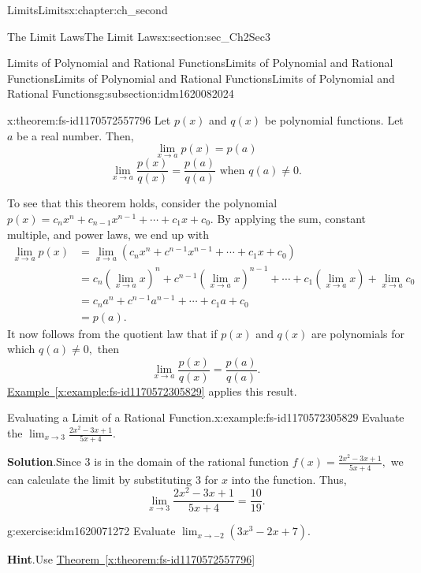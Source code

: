 \documentclass[oneside,10pt,]{book}
\newcommand{\blocktitlefont}{\relax}
\newcommand{\xreffont}{\relax}
\numberwithin{equation}{section}
\newcommand{\amp}{&}
\begin{document}
\begin{chapterptx}{Limits}{}{Limits}{}{}{x:chapter:ch_second}
\begin{sectionptx}{The Limit Laws}{}{The Limit Laws}{}{}{x:section:sec_Ch2Sec3}
\begin{subsectionptx}{Limits of Polynomial and Rational FunctionsLimits of Polynomial and Rational Functions}{}{Limits of Polynomial and Rational FunctionsLimits of Polynomial and Rational Functions}{}{}{g:subsection:idm1620082024}
\begin{theorem}{}{}{x:theorem:fs-id1170572557796}%
Let \(p(x)\) and \(q(x)\) be polynomial functions. Let \(a\) be a real number. Then,%
%
\begin{equation*}
\lim_{x \to a }p(x)=p(a)
\end{equation*}
%
\begin{equation*}
\lim_{x \to a }\frac{p(x)}{q(x)}=\frac{p(a)}{q(a)} \text{ when } q(a)\neq 0.
\end{equation*}
\end{theorem}
To see that this theorem holds, consider the polynomial \(p(x)=c_nx^n+c_{n-1}x^{n-1}+\cdots+c_1x+c_0.\) By applying the sum, constant multiple, and power laws, we end up with%
%
\begin{align*}
\lim_{x \to a }p(x)    \amp=\lim_{x \to a }(c_nx^n+c^{n-1}x^{n-1}+\cdots+c_1x+c_0)\\
\amp=c_n(\lim_{x \to a }x)^n+c^{n-1}(\lim_{x \to a }x)^{n-1}+\cdots+c_1(\lim_{x \to a }x)+\lim_{x \to a }c_0\\
\amp=c_na^n+c^{n-1}a^{n-1}+\cdots+c_1a+c_0\\
\amp=p(a).
\end{align*}
It now follows from the quotient law that if \(p(x)\) and \(q(x)\) are polynomials for which \(q(a)\neq 0,\) then%
%
\begin{equation*}
\lim_{x \to a }\frac{p(x)}{q(x)}=\frac{p(a)}{q(a)}.
\end{equation*}
\hyperref[x:example:fs-id1170572305829]{Example~{\xreffont\ref{x:example:fs-id1170572305829}}} applies this result.%
\begin{example}{Evaluating a Limit of a Rational Function.}{x:example:fs-id1170572305829}%
Evaluate the \(\lim_{x \to 3 }\frac{2x^2-3x+1}{5x+4}.\)%
\par\smallskip%
\noindent\textbf{\blocktitlefont Solution}.\hypertarget{g:solution:idm1620072040}{}\quad{}Since 3 is in the domain of the rational function \(f(x)=\frac{2x^2-3x+1}{5x+4},\) we can calculate the limit by substituting 3 for \(x\) into the function. Thus,%
%
\begin{equation*}
\lim_{x \to 3 }\frac{2x^2-3x+1}{5x+4}=\frac{10}{19}.
\end{equation*}
\end{example}
\begin{inlineexercise}{}{g:exercise:idm1620071272}%
Evaluate \(\lim_{x \to -2 }(3x^3-2x+7).\)%
\par\smallskip%
\noindent\textbf{\blocktitlefont Hint}.\hypertarget{g:hint:idm1620067560}{}\quad{}Use \hyperref[x:theorem:fs-id1170572557796]{Theorem~{\xreffont\ref{x:theorem:fs-id1170572557796}}}%

\end{inlineexercise}
\end{subsectionptx}
\end{sectionptx}
\end{chapterptx}
\end{document}
